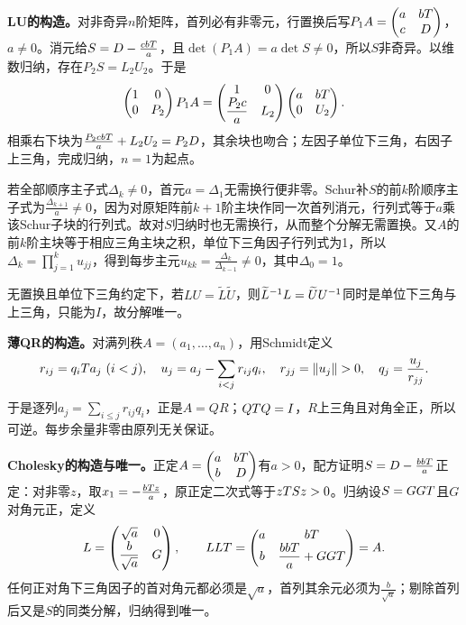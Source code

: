 \label{der:8-5}
\textbf{LU的构造。}对非奇异$n$阶矩阵，首列必有非零元，行置换后写$P_1A=\begin{pmatrix}a&bT\\c&D\end{pmatrix}$，$a\ne0$。消元给$S=D-\frac{cbT}{a}$，且$\det(P_1A)=a\det S\ne0$，所以$S$非奇异。以维数归纳，存在$P_2S=L_2U_2$。于是
\[\begin{pmatrix}1&0\\0&P_2\end{pmatrix}P_1A=
\begin{pmatrix}1&0\\\dfrac{P_2c}{a}&L_2\end{pmatrix}
\begin{pmatrix}a&bT\\0&U_2\end{pmatrix}.\]
相乘右下块为$\frac{P_2cbT}{a}+L_2U_2=P_2D$，其余块也吻合；左因子单位下三角，右因子上三角，完成归纳，$n=1$为起点。

若全部顺序主子式$\Delta_k\ne0$，首元$a=\Delta_1$无需换行便非零。Schur补$S$的前$k$阶顺序主子式为$\frac{\Delta_{k+1}}{a}\ne0$，因为对原矩阵前$k+1$阶主块作同一次首列消元，行列式等于$a$乘该Schur子块的行列式。故对$S$归纳时也无需换行，从而整个分解无需置换。又$A$的前$k$阶主块等于相应三角主块之积，单位下三角因子行列式为1，所以$\Delta_k=\prod_{j=1}^k u_{jj}$，得到每步主元$u_{kk}=\frac{\Delta_k}{\Delta_{k-1}}\ne0$，其中$\Delta_0=1$。

无置换且单位下三角约定下，若$LU=\widetilde L\widetilde U$，则$\widetilde L^{-1} L=\widetilde U U^{-1}$同时是单位下三角与上三角，只能为$I$，故分解唯一。

\textbf{薄QR的构造。}对满列秩$A=(a_1,\ldots,a_n)$，用Schmidt定义
\[r_{ij}=q_iT a_j\ (i<j),\quad u_j=a_j-\sum_{i<j}r_{ij}q_i,\quad r_{jj}=\left\lVert u_j\right\rVert>0,\quad q_j=\dfrac{u_j}{r_{jj}}.\]
于是逐列$a_j=\sum_{i\le j}r_{ij}q_i$，正是$A=QR$；$QT Q=I$，$R$上三角且对角全正，所以可逆。每步余量非零由原列无关保证。

\textbf{Cholesky的构造与唯一。}正定$A=\begin{pmatrix}a&bT\\b&D\end{pmatrix}$有$a>0$，配方证明$S=D-\frac{bbT}{a}$正定：对非零$z$，取$x_1=-\frac{bT z}{a}$，原正定二次式等于$zT Sz>0$。归纳设$S=GGT$且$G$对角元正，定义
\[L=\begin{pmatrix}\sqrt a&0\\\dfrac{b}{\sqrt a}&G\end{pmatrix},\qquad
LLT=\begin{pmatrix}a&bT\\b&\dfrac{bbT}{a}+GGT\end{pmatrix}=A.\]
任何正对角下三角因子的首对角元都必须是$\sqrt a$，首列其余元必须为$\frac{b}{\sqrt a}$；剔除首列后又是$S$的同类分解，归纳得到唯一。

